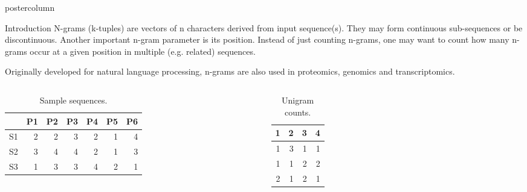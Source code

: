 \documentclass[final]{beamer}\usepackage[]{graphicx}\usepackage[]{color}
\newlength{\columnheight}
\begin{document}
\begin{frame}
  \begin{columns}
    \begin{column}{.49\textwidth}
      \begin{beamercolorbox}[center,wd=\textwidth]{postercolumn}
        \begin{minipage}[T]{.95\textwidth}
          \parbox[t][\columnheight]{\textwidth}
            {
    
        
    \begin{block}{Introduction}
      N-grams (k-tuples) are vectors of n characters derived from input sequence(s). They may form continuous sub-sequences or be discontinuous. Another important n-gram parameter is its position. Instead of just counting n-grams, one may want to count how many n-grams occur at a given position in multiple (e.g. related) sequences.

Originally developed for natural language processing, n-grams are also used in proteomics, genomics and transcriptomics.

\small{
       \begin{columns}[c] %
\begin{table}[ht]
\centering
\begin{tabular}{rrrrrrr}
  \hline
 & P1 & P2 & P3 & P4 & P5 & P6 \\ 
  \hline
S1 & 2 & 2 & 3 & 2 & 1 & 4 \\ 
  S2 & 3 & 4 & 4 & 2 & 1 & 3 \\ 
  S3 & 1 & 3 & 3 & 4 & 2 & 1 \\ 
   \hline
\end{tabular}
\caption{Sample sequences.} 
\end{table}

      
      

    
\begin{table}[ht]
\centering
\begin{tabular}{rrrr}
  \hline
1 & 2 & 3 & 4 \\ 
  \hline
1 & 3 & 1 & 1 \\ 
  1 & 1 & 2 & 2 \\ 
  2 & 1 & 2 & 1 \\ 
   \hline
\end{tabular}
\caption{Unigram counts.} 
\end{table}



\end{columns}}
\end{block}}
\end{minipage}
\end{beamercolorbox}
\end{column}
\end{columns}
\end{frame}
\end{document}
